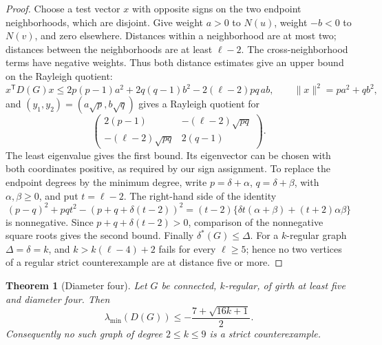 \documentclass[a4paper,10pt,reqno]{amsart}
\theoremstyle{plain}
\newtheorem{theorem}{Theorem}[section]
\theoremstyle{definition}
\theoremstyle{remark}
\newcommand{\resultbox}[1]{\boxed{#1}}
\begin{document}
\begin{proof}
Choose a test vector \(x\) with opposite signs on the two endpoint
neighborhoods, which are disjoint. Give weight \(a>0\) to \(N(u)\),
weight \(-b<0\) to \(N(v)\), and zero elsewhere.  Distances within a neighborhood are at
most two; distances between the neighborhoods are at least \(\ell-2\).
The cross-neighborhood terms have negative weights. Thus both distance
estimates give an upper bound on the Rayleigh quotient:
\[
 x^{\mathsf T}D(G)x\le2p(p-1)a^2+2q(q-1)b^2-2(\ell-2)pq\,ab,\qquad
 \|x\|^2=pa^2+qb^2,
\]
and \((y_1,y_2)=(a\sqrt p,b\sqrt q)\) gives a Rayleigh quotient for
\[
 \begin{pmatrix}
 2(p-1)&-(\ell-2)\sqrt{pq}\\
 -(\ell-2)\sqrt{pq}&2(q-1)
 \end{pmatrix}.
\]
The least eigenvalue gives the first bound.  Its eigenvector can be chosen
with both coordinates positive, as required by our sign assignment.
To replace the endpoint degrees by the minimum degree, write
\(p=\delta+\alpha\), \(q=\delta+\beta\), with
\(\alpha,\beta\ge0\), and put \(t=\ell-2\).  The right-hand side of the identity
\[
 (p-q)^2+pqt^2-(p+q+\delta(t-2))^2
 =(t-2)\{\delta t(\alpha+\beta)+(t+2)\alpha\beta\}
\]
is nonnegative.  Since \(p+q+\delta(t-2)>0\), comparison of the nonnegative
square roots gives the second bound.  Finally \(\delta^*(G)\le\Delta\).
For a \(k\)-regular graph \(\Delta=\delta=k\), and \(k>k(\ell-4)+2\) fails
for every \(\ell\ge5\); hence no two vertices of a regular strict
counterexample are at distance five or more.
\end{proof}

\begin{theorem}[Diameter four]\label{thm:diameter-four}
Let \(G\) be connected, \(k\)-regular, of girth at least five and diameter
four.  Then
\[
 \resultbox{
 \lambda_{\min}(D(G))\le-\frac{7+\sqrt{16k+1}}2.
 }
\]
Consequently no such graph of degree \(2\le k\le9\) is a strict
counterexample.
\end{theorem}
\end{document}
